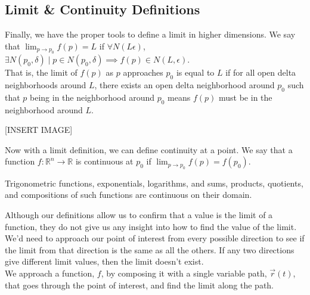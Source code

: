 \subsection{Limit \& Continuity Definitions}
\noindent
Finally, we have the proper tools to define a limit in higher dimensions. We say that $\lim_{p\to p_0}f(p) = L$ if $\forall N(L\epsilon)$, $\exists N(p_0,\delta) \mid p \in N(p_0, \delta) \implies f(p) \in N(L, \epsilon)$.\\
That is, the limit of $f(p)$ as $p$ approaches $p_0$ is equal to $L$ if for all open delta neighborhoods around $L$, there exists an open delta neighborhood around $p_0$ such that $p$ being in the neighborhood around $p_0$ means $f(p)$ must be in the neighborhood around $L$.

[INSERT IMAGE]

\noindent
Now with a limit definition, we can define continuity at a point. We say that a function $f : \mathbb{R}^n \to \mathbb{R}$ is continuous at $p_0$ if $\lim_{p \to p_0}{f(p)} = f(p_0)$.\\

\noindent
\begin{theorem}
	Trigonometric functions, exponentials, logarithms, and sums, products, quotients, and compositions of such functions are continuous on their domain.
\end{theorem}

\noindent
Although our definitions allow us to confirm that a value is the limit of a function, they do not give us any insight into how to find the value of the limit. We'd need to approach our point of interest from every possible direction to see if the limit from that direction is the same as all the others. If any two directions give different limit values, then the limit doesn't exist.\\
We approach a function, $f$, by composing it with a single variable path, $\vec{r}(t)$, that goes through the point of interest, and find the limit along the path.\\

